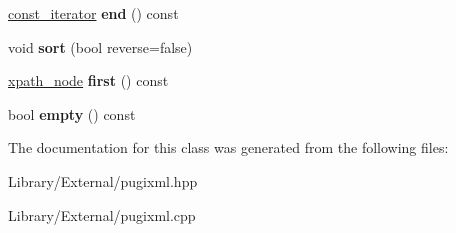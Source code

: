 \begin{DoxyCompactItemize}
\item 
\hypertarget{classpugi_1_1xpath__node__set_a8dea1d6fc28789d909936805ed1afcd8}{}\hyperlink{classpugi_1_1xpath__node}{const\+\_\+iterator} {\bfseries end} () const \label{classpugi_1_1xpath__node__set_a8dea1d6fc28789d909936805ed1afcd8}

\item 
\hypertarget{classpugi_1_1xpath__node__set_a7f264ad9a2736e9dc2d6a2de25cb67d1}{}void {\bfseries sort} (bool reverse=false)\label{classpugi_1_1xpath__node__set_a7f264ad9a2736e9dc2d6a2de25cb67d1}

\item 
\hypertarget{classpugi_1_1xpath__node__set_a89c35cc7c823b842b8afeccc796aa6f9}{}\hyperlink{classpugi_1_1xpath__node}{xpath\+\_\+node} {\bfseries first} () const \label{classpugi_1_1xpath__node__set_a89c35cc7c823b842b8afeccc796aa6f9}

\item 
\hypertarget{classpugi_1_1xpath__node__set_a854e0b24839e8fdaa6b14bbd66e7ce98}{}bool {\bfseries empty} () const \label{classpugi_1_1xpath__node__set_a854e0b24839e8fdaa6b14bbd66e7ce98}

\end{DoxyCompactItemize}


The documentation for this class was generated from the following files\+:\begin{DoxyCompactItemize}
\item 
Library/\+External/pugixml.\+hpp\item 
Library/\+External/pugixml.\+cpp\end{DoxyCompactItemize}

